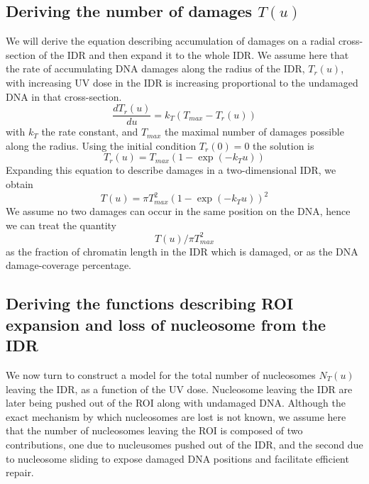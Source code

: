 \documentclass[12pt]{article}
\begin{document}
\subsection{Deriving the number of damages $T(u)$}
We will derive the equation describing accumulation of damages on a radial cross-section of the IDR and then expand it to the whole IDR. We assume here that the rate of accumulating DNA damages along the radius of the IDR, $T_r(u)$, with increasing UV dose in the IDR is increasing proportional to the undamaged DNA in that cross-section.
\begin{equation}
\frac{dT_r(u)}{du}=k_T\left(T_{max}-T_r(u)\right)
\end{equation}
with $k_T$ the rate constant, and $T_{max}$ the maximal number of damages possible along the radius.
Using the initial condition $T_r(0) = 0$ the solution is
\begin{equation}
T_r(u) = T_{max}\left(1-\exp(-k_T u)\right) 
\end{equation}
Expanding this equation to describe damages in a two-dimensional IDR, we obtain 
\begin{equation}
T(u) =  \pi T^2_{max}\left(1-\exp(-k_T u)\right)^2 
\end{equation}
We assume no two damages can occur in the same position on the DNA, hence we can treat the quantity 
\begin{equation*}
T(u)/\pi T_{max}^2
\end{equation*}
as the fraction of chromatin length in the IDR which is damaged, or as the DNA damage-coverage percentage. 

\subsection{Deriving the functions describing ROI expansion and loss of nucleosome from the IDR}
We now turn to construct a model for the total number of nucleosomes $N_T(u)$ leaving the IDR, as a function of the UV dose. Nucleosome leaving the IDR are later being pushed out of the ROI along with undamaged DNA. Although the exact mechanism by which nucleosomes are lost is not known, we assume here that the number of nucleosomes leaving the ROI is composed of two contributions, one due to nucleusomes pushed out of the IDR, and the second due to nucleosome sliding to expose damaged DNA positions and facilitate efficient repair. 
\end{document}
